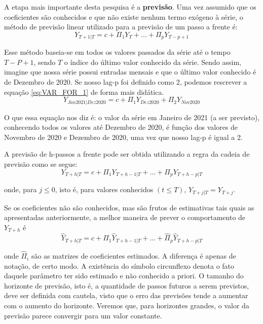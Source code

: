 \documentclass[12pt]{article}
\begin{document}
	A etapa mais importante desta pesquisa é a \textbf{previsão}. Uma vez assumido que os coeficientes são conhecidos e que não existe nenhum termo exógeno à série, o método de previsão linear utilizado para a previsão de um passo a frente é:
	\begin{equation}\label{eq:VAR_FOR_1}
		Y_{T+1|T}=c+\Pi_1Y_{T}+...+\Pi_pY_{T-p+1}
	\end{equation} 
	
	Esse método baseia-se em todos os valores passados da série até o tempo $T-P+1$, sendo $T$ o índice do último valor conhecido da série. Sendo assim, imagine que nossa série possui entradas mensais e que o último valor conhecido é de Dezembro de 2020. Se nosso \textrm{lag-p}  foi definido como 2, podemos rescrever a equação \ref{eq:VAR_FOR_1} de forma mais didática.
	\begin{equation*}
		Y_{Jan2021|Dez2020}=c+\Pi_1Y_{Dez2020}+\Pi_2Y_{Nov2020}
	\end{equation*}

	O que essa equação nos diz é: o valor da série em Janeiro de 2021 (a ser previsto), conhecendo todos os valores até Dezembro de 2020, é função dos valores de Novembro de 2020 e Dezembro de 2020, uma vez que nosso \textrm{lag-p} é igual a 2.
	
	A previsão de h-passos a frente pode ser obtida utilizando a regra da cadeia de previsão \cite{VAR} como se segue:
	\begin{equation}\label{eq:VAR_FOR_h}
		Y_{T+h|T}=c+\Pi_1Y_{T+h-1|T}+...+\Pi_pY_{T+h-p|T}
	\end{equation}
	
	onde, para $j\leq0$, isto é, para valores conhecidos $(t\leq T)$, $Y_{T+j|T}=Y_{T+j}$.
	
	Se os coeficientes não são conhecidos, mas são frutos de estimativas tais quais as apresentadas anteriormente, a melhor maneira de prever o comportamento de $Y_{T+h}$ é
	\begin{equation}
		\hat{Y}_{T+h|T}=c+\hat{\Pi}_1\hat{Y}_{T+h-1|T}+...+\hat{\Pi}_p\hat{Y}_{T+h-p|T}
	\end{equation}

	onde $\hat{\Pi}_i$ são as matrizes de coeficientes estimados. A diferença é apenas de notação, de certo modo. A existência do símbolo circunflexo denota o fato daquele parâmetro ter sido estimado e não conhecido a priori. O tamanho do horizonte de previsão, isto é, a quantidade de passos futuros a serem previstos, deve ser definida com cautela,  visto que o erro das previsões tende a aumentar com o aumento do horizonte. Veremos que, para horizontes grandes, o valor da previsão parece convergir para um valor constante.
	
\end{document}

